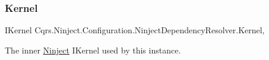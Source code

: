 \subsubsection{\texorpdfstring{Kernel}{Kernel}}
{\footnotesize\ttfamily I\+Kernel Cqrs.\+Ninject.\+Configuration.\+Ninject\+Dependency\+Resolver.\+Kernel\hspace{0.3cm}{\ttfamily [get]}, {\ttfamily [protected]}}



The inner \hyperlink{namespaceCqrs_1_1Ninject}{Ninject} I\+Kernel used by this instance. 

